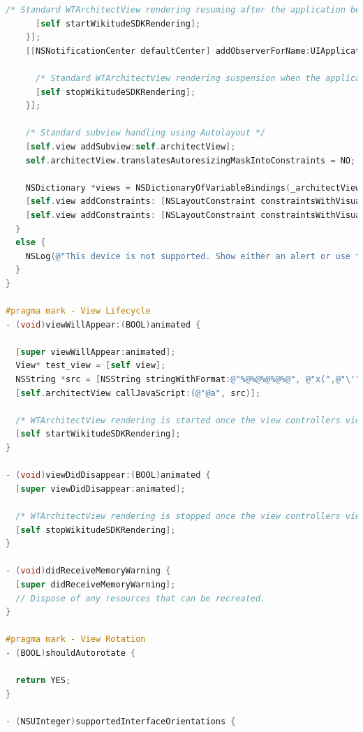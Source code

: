 \documentclass[thesis=M,english]{FITthesis}[2012/10/20]
\begin{document}
\begin{lstlisting}[language=C]
      /* Standard WTArchitectView rendering resuming after the application becomes active again */
      [self startWikitudeSDKRendering];
    }];
    [[NSNotificationCenter defaultCenter] addObserverForName:UIApplicationWillResignActiveNotification object:nil queue:[NSOperationQueue mainQueue] usingBlock:^(NSNotification *note) {
      
      /* Standard WTArchitectView rendering suspension when the application resignes active */
      [self stopWikitudeSDKRendering];
    }];
    
    /* Standard subview handling using Autolayout */
    [self.view addSubview:self.architectView];
    self.architectView.translatesAutoresizingMaskIntoConstraints = NO;
    
    NSDictionary *views = NSDictionaryOfVariableBindings(_architectView);
    [self.view addConstraints: [NSLayoutConstraint constraintsWithVisualFormat:@"|[_architectView]|" options:0 metrics:nil views:views] ];
    [self.view addConstraints: [NSLayoutConstraint constraintsWithVisualFormat:@"V:|[_architectView]|" options:0 metrics:nil views:views] ];
  }
  else {
    NSLog(@"This device is not supported. Show either an alert or use this class method even before presenting the view controller that manages the WTArchitectView. Error: %@", [deviceSupportError localizedDescription]);
  }
}

#pragma mark - View Lifecycle
- (void)viewWillAppear:(BOOL)animated {
  
  [super viewWillAppear:animated];
  View* test_view = [self view];
  NSString *src = [NSString stringWithFormat:@"%@%@%@%@%@", @"x(",@"\'" ,[test_view objSrc], @"\'", @");"];
  [self.architectView callJavaScript:(@"@a", src)];
  
  /* WTArchitectView rendering is started once the view controllers view will appear */
  [self startWikitudeSDKRendering];
}

- (void)viewDidDisappear:(BOOL)animated {
  [super viewDidDisappear:animated];
  
  /* WTArchitectView rendering is stopped once the view controllers view did disappear */
  [self stopWikitudeSDKRendering];
}

- (void)didReceiveMemoryWarning {
  [super didReceiveMemoryWarning];
  // Dispose of any resources that can be recreated.
}

#pragma mark - View Rotation
- (BOOL)shouldAutorotate {
  
  return YES;
}

- (NSUInteger)supportedInterfaceOrientations {
  

\end{lstlisting}
\end{document}
